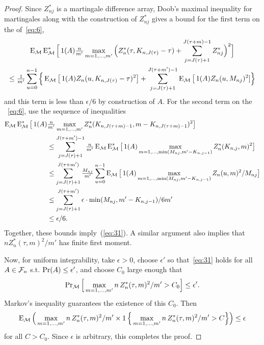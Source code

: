 \documentclass[11pt]{article}
\begin{document}
\begin{proof}
  Since $Z_{nj}^*$ is a martingale difference array, Doob's maximal
  inequality for martingales \citep[see][Theorem 15.15, for
  example]{Dav:94} along with the construction of $Z_{nj}^{*}$ gives
  a bound for the first term on the  of~\eqref{eq:6},
  \begin{multline*}
  \operatorname{E}_{\mathcal{M}} \operatorname{E}_{\mathcal{M}}^* \Big[\operatorname{1}(A) \tfrac{n}{m'}\max_{m = 1,\dots, m'}
  \Big(Z_n^*(\tau, K_{n,J(\tau)} - \tau) + \sum_{j=J(\tau)+1}^{J(\tau + m)-1} Z_{nj}^*\Big)^2\Big] \\
  \leq \tfrac{1}{m'} \sum_{u = 0}^{n-1} \Big\{\operatorname{E}_{\mathcal{M}}\big[\operatorname{1}(A) Z_n(u, K_{n,J(\tau)} - \tau)^2\big] +
  \sum_{j=J(\tau)+1}^{J(\tau + m')-1} \operatorname{E}_{\mathcal{M}} \big[\operatorname{1}(A) Z_n(u, M_{nj})^2]\Big\}
  \end{multline*}
  and this term is less than $\epsilon/6$ by construction of $A$.
  For the second term on the ~\eqref{eq:6}, use the sequence of inequalities
  \begin{align*}
  \operatorname{E}_{\mathcal{M}} \operatorname{E}_{\mathcal{M}}^* \big[\operatorname{1}(A) &\tfrac{n}{m'}
  \max_{m=1,\dots,m'} Z_n^*(K_{n,J(\tau+m)-1}, m - K_{n,J(\tau + m)-1})^2 \big] \\
  &\leq \sum_{j=J(\tau) + 1}^{J(\tau+m')-1} \tfrac{n}{m'} \operatorname{E}_{\mathcal{M}} \operatorname{E}_{\mathcal{M}}^* \big[\operatorname{1}(A)
  \max_{m=1,\dots, \min(M_{nj}, m' - K_{n,j-1})} Z_n^*(K_{n,j}, m)^2 \big] \\
  &\leq \sum_{j=J(\tau) + 1}^{J(\tau+m')} \tfrac{M_{nj}}{m'} \sum_{u=0}^{n-1} \operatorname{E}_{\mathcal{M}} \big[\operatorname{1}(A)
  \max_{m=1,\dots,\min(M_{nj}, m' - K_{n,j-1})} Z_n(u, m)^2 / M_{nj} \big] \\
  &\leq \sum_{j=J(\tau) + 1}^{J(\tau+m')} \epsilon \cdot \min(M_{nj}, m' - K_{n,j-1}) / 6 m' \\
  &\leq \epsilon/6.
  \end{align*}
  Together, these bounds imply~(\ref{eq:31}). A
  similar argument also implies that $n Z_n^*(\tau, m)^2 / m'$ has
  finite first moment.

  Now, for uniform integrability, take $\epsilon > 0$, choose
  $\epsilon'$ so that~\eqref{eq:31} holds for all $A \in \mathcal{F}_n$
  s.t. $\operatorname{Pr}(A) \leq \epsilon'$, and choose $C_0$ large enough that
  \begin{equation*}
    \operatorname{Pr}_{\mathcal{M}}\Big[ \max_{m = 1,\dots,m'} n \, Z^*_n(\tau, m)^2 / m' > C_0 \Big] \leq \epsilon'.
  \end{equation*}
  Markov's inequality guarantees the existence of this $C_0$. Then
  \begin{equation*}
    \operatorname{E}_{\mathcal{M}} \Big(\max_{m = 1,\dots,m'} n \, Z^*_n(\tau, m)^2 / m'
    \times \operatorname{1}\Big\{ \max_{m = 1,\dots,m'} n \, Z^*_n(\tau, m)^2 / m' > C \Big\}\Big) \leq \epsilon
  \end{equation*}
  for all $C > C_0$. Since $\epsilon$ is arbitrary, this completes the proof.
\end{proof}
\end{document}
